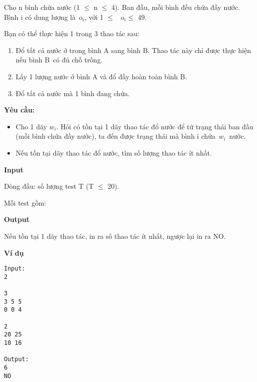 

Cho n bình chứa nước (1  $\le$  n  $\le$  4). Ban đầu, mỗi bình đều chứa đầy nước. Bình i có dung lượng là o$_i$, với 1  $\le$  o$_i$$\le$  49.

Bạn có thể thực hiện 1 trong 3 thao tác sau:
\begin{enumerate}
	\item Đổ tất cả nước ở trong bình A sang bình B. Thao tác này chỉ được thực hiện nếu bình B có đủ chỗ trống.
	\item Lấy 1 lượng nước ở bình A và đổ đầy hoàn toàn bình B.
	\item Đổ tất cả nước mà 1 bình đang chứa.
\end{enumerate}

\textbf{Yêu cầu: }
\begin{itemize}
	\item Cho 1 dãy $w_{i}$. Hỏi có tồn tại 1 dãy thao tác đổ nước để từ trạng thái ban đầu (mỗi bình chứa đầy nước), ta đến được trạng thái mà bình i chứa $w_{i}$ nước.
	\item Nếu tồn tại dãy thao tác đổ nước, tìm số lượng thao tác ít nhất.
\end{itemize}

\textbf{Input}

Dòng đầu: số lượng test T (T  $\le$  20).

Mỗi test gồm:

\textbf{Output}

Nếu tồn tại 1 dãy thao tác, in ra số thao tác ít nhất, ngược lại in ra NO.

\textbf{Ví dụ}
\begin{verbatim}
Input:
2

3
3 5 5
0 0 4

2
20 25
10 16

Output:
6
NO
\end{verbatim}
